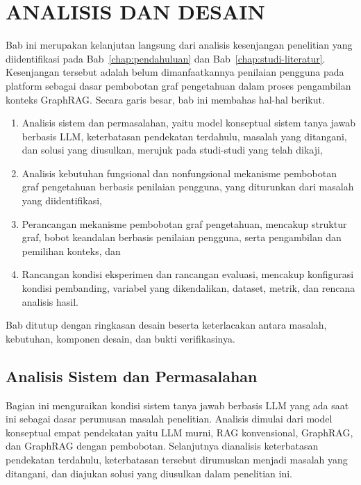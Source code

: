 
\chapter{ANALISIS DAN DESAIN}
\label{chap:analisis-desain}

Bab ini merupakan kelanjutan langsung dari analisis kesenjangan penelitian yang diidentifikasi pada Bab~\ref{chap:pendahuluan} dan Bab~\ref{chap:studi-literatur}. Kesenjangan tersebut adalah belum dimanfaatkannya penilaian pengguna pada platform sebagai dasar pembobotan graf pengetahuan dalam proses pengambilan konteks GraphRAG. Secara garis besar, bab ini membahas hal-hal berikut.
\begin{enumerate}[1.]
    \item Analisis sistem dan permasalahan, yaitu model konseptual sistem tanya jawab berbasis LLM, keterbatasan pendekatan terdahulu, masalah yang ditangani, dan solusi yang diusulkan, merujuk pada studi-studi yang telah dikaji,
    \item Analisis kebutuhan fungsional dan nonfungsional mekanisme pembobotan graf pengetahuan berbasis penilaian pengguna, yang diturunkan dari masalah yang diidentifikasi,
    \item Perancangan mekanisme pembobotan graf pengetahuan, mencakup struktur graf, bobot keandalan berbasis penilaian pengguna, serta pengambilan dan pemilihan konteks, dan
    \item Rancangan kondisi eksperimen dan rancangan evaluasi, mencakup konfigurasi kondisi pembanding, variabel yang dikendalikan, dataset, metrik, dan rencana analisis hasil.
\end{enumerate}
Bab ditutup dengan ringkasan desain beserta keterlacakan antara masalah, kebutuhan, komponen desain, dan bukti verifikasinya.


\section{Analisis Sistem dan Permasalahan}
\label{sec:kondisi-saat-ini}

Bagian ini menguraikan kondisi sistem tanya jawab berbasis LLM yang ada saat ini sebagai dasar perumusan masalah penelitian. Analisis dimulai dari model konseptual empat pendekatan yaitu LLM murni, RAG konvensional, GraphRAG, dan GraphRAG dengan pembobotan. Selanjutnya dianalisis keterbatasan pendekatan terdahulu, keterbatasan tersebut dirumuskan menjadi masalah yang ditangani, dan diajukan solusi yang diusulkan dalam penelitian ini.

